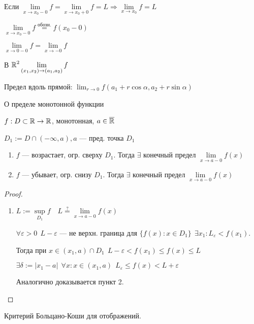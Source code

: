 Если $\lim\limits_{x\to x_0-0} f = \lim\limits_{x\to x_0+0} f=L \Rightarrow \lim\limits_{x\to x_0} f = L$

$\lim\limits_{x\to x_0-0} f \stackrel{\text{обозн.}}{=} f(x_0-0)$

$\lim\limits_{x\to 0-0} f = \lim\limits_{x\to -0} f$

В $\operatorname*{\mathbb{R}}^2 \lim\limits_{(x_1,x_2)\to(a_1, a_2)} f$

Предел вдоль прямой: $\lim_{r\to 0} f(a_1+r\cos \alpha, a_2+r\sin\alpha)$

\begin{theorem}
    О пределе монотонной функции

    $f:D\subset \operatorname*{\mathbb{R}} \to \operatorname*{\mathbb{R}}$, монотонная, $a\in\overline{\operatorname*{\mathbb{R}}}$

    $D_1:=D\cap (-\infty, a), a$ --- пред. точка $D_1$

    \begin{enumerate}
        \item $f$ --- возрастает, огр. сверху $D_1$. Тогда $\exists$ конечный предел $\lim\limits_{x\to a-0} f(x)$
        \item $f$ --- убывает, огр. снизу $D_1$. Тогда $\exists$ конечный предел $\lim\limits_{x\to a-0} f(x)$
    \end{enumerate}
\end{theorem}
\begin{proof}
    \begin{enumerate}
        \item $L:= \sup\limits_{D_1} f \quad L\stackrel{?}{=}\lim\limits_{x\to a-0} f(x)$
    
        $\forall \varepsilon > 0 \ \ L-\varepsilon$ --- не верхн. граница для $\{f(x) : x\in D_1\} \ \ \exists x_1: L_\varepsilon<f(x_1)$.

        Тогда при $x\in(x_1, a)\cap D_1 \ \ L-\varepsilon < f(x_1) \leq f(x) \leq L$

        $\exists \delta:=|x_1-a| \ \ \forall x : x\in(x_1, a) \ \ L_\varepsilon\leq f(x) < L+\varepsilon$

        Аналогично доказывается пункт 2.
    \end{enumerate}
\end{proof}

Критерий Больцано-Коши для отображений.

